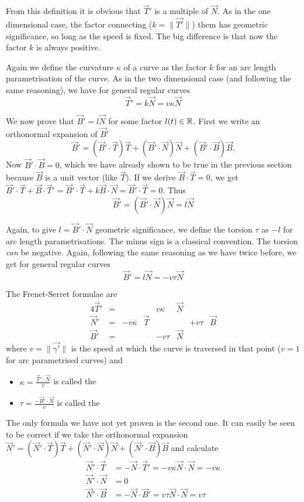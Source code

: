 From this definition it is obvious that $\vec{T}'$ is a multiple of $\vec{N}$. As in the one dimensional case, the factor connecting ($k = \lVert \vec{T'} \lVert$) them has geometric significance, so long as the speed is fixed. The big difference is that now the factor $k$ is always positive.

Again we define the curvature $\kappa$ of a curve as the factor $k$ for an arc length parametrisation of the curve. As in the two dimensional case (and following the same reasoning), we have for general regular curves
\[ \vec{T}' = k \vec{N} = v \kappa \vec{N} \]

We now prove that $\vec{B}'= l \vec{N}$ for some factor $l(t)\in \mathbb{R}$. First we write an orthonormal expansion of $\vec{B}'$
\[ \vec{B}' = (\vec{B}'\cdot \vec{T})\vec{T} + (\vec{B}'\cdot \vec{N})\vec{N} + (\vec{B}'\cdot \vec{B})\vec{B}. \]
Now $\vec{B}'\cdot \vec{B}=0$, which we have already shown to be true in the previous section because $\vec{B}$ is a unit vector (like $\vec{T}$). If we derive $\vec{B}\cdot \vec{T} = 0$, we get $\vec{B}'\cdot \vec{T} + \vec{B}\cdot \vec{T}' = \vec{B}'\cdot \vec{T} + k \vec{B}\cdot \vec{N} = \vec{B}'\cdot \vec{T} = 0$. Thus 
\[ \vec{B}' = (\vec{B}'\cdot \vec{N})\vec{N} = l \vec{N} \]

Again, to give $l = \vec{B}'\cdot \vec{N}$ geometric significance, we define the torsion $\tau$ as $-l$ for arc length parametrisations. The minus sign is a classical convention. The torsion \textit{can} be negative. Again, following the same reasoning as we have twice before, we get for general regular curves
\[ \vec{B}' = l \vec{N} = - v \tau \vec{N} \]

\begin{eigenschap}
The Frenet-Serret formulae are
\begin{alignat*}{4}
\vec{T}' &= & & & v\kappa&\vec{N} & & \\
\vec{N}' &= & -v\kappa&\vec{T} & & & +v\tau&\vec{B} \\
\vec{B}' &= & & & -v\tau&\vec{N} & &
\end{alignat*}
where $v = \lVert \vec{\gamma'} \lVert$ is the speed at which the curve is traversed in that point ($v=1$ for arc parametrised curves) and
\begin{itemize}
\item $\kappa = \frac{\vec{T}'\cdot \vec{N}}{v}$ is called the 
\item $\tau = \frac{- \vec{B}'\cdot \vec{N}}{v}$ is called the 
\end{itemize}
\end{eigenschap}
The only formula we have not yet proven is the second one. It can easily be seen to be correct if we take the orthonormal expansion $\vec{N}' = (\vec{N}'\cdot \vec{T})\vec{T} + (\vec{N}'\cdot \vec{N})\vec{N} + (\vec{N}'\cdot \vec{B})\vec{B}$ and calculate
\begin{align*}
\vec{N}'\cdot \vec{T} &= - \vec{N}\cdot \vec{T}' = -v\kappa \vec{N}\cdot \vec{N} = -v\kappa \\
\vec{N}'\cdot \vec{N} &= 0 \\
\vec{N}'\cdot \vec{B} &= - \vec{N}\cdot \vec{B}' = v\tau \vec{N}\cdot \vec{N} = v\tau
\end{align*}

